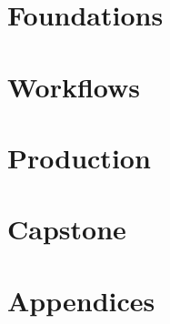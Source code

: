 \documentclass[11pt,twoside,openright]{book}
\begin{document}
\frontmatter



\tableofcontents
\listoffigures



\mainmatter

\part{Foundations}





\part{Workflows}




\part{Production}





\part{Capstone}


\appendix
\part{Appendices}





\backmatter

\printindex
\end{document}
